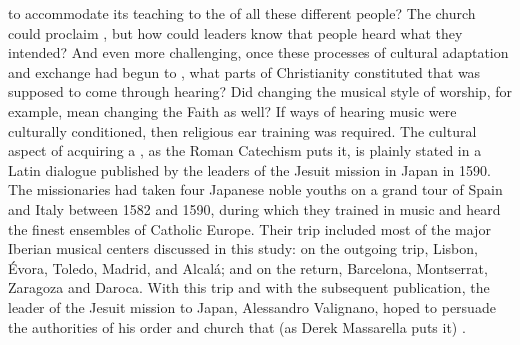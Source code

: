 to accommodate its teaching to the  of all these
different people?
The church could proclaim , but how could leaders know that
people heard what they intended?
And even more challenging, once these processes of cultural adaptation and
exchange had begun to , what parts of Christianity constituted
 that was supposed to come through hearing?
Did changing the musical style of worship, for example, mean changing the Faith
as well?
If ways of hearing music were culturally conditioned, then religious ear
training was required.
The cultural aspect of acquiring a , as the Roman
Catechism puts it, is plainly stated in a Latin dialogue published by the
leaders of the Jesuit mission in Japan in 1590.%
    \Autocite{Sande:DeMissioneLegatorum}
The missionaries had taken four Japanese noble youths on a grand tour of Spain
and Italy between 1582 and 1590, during which they trained in music and heard
the finest ensembles of Catholic Europe.
Their trip included most of the major Iberian musical centers discussed in this
study: on the outgoing trip, Lisbon, Évora, Toledo, Madrid, and Alcalá; and on
the return, Barcelona, Montserrat, Zaragoza and Daroca.
With this trip and with the subsequent publication, the leader of the Jesuit
mission to Japan, Alessandro Valignano, hoped to persuade the authorities of his
order and church that (as Derek Massarella puts it) .%
    \Autocite[4]{Massarella:JapaneseTravellers}

